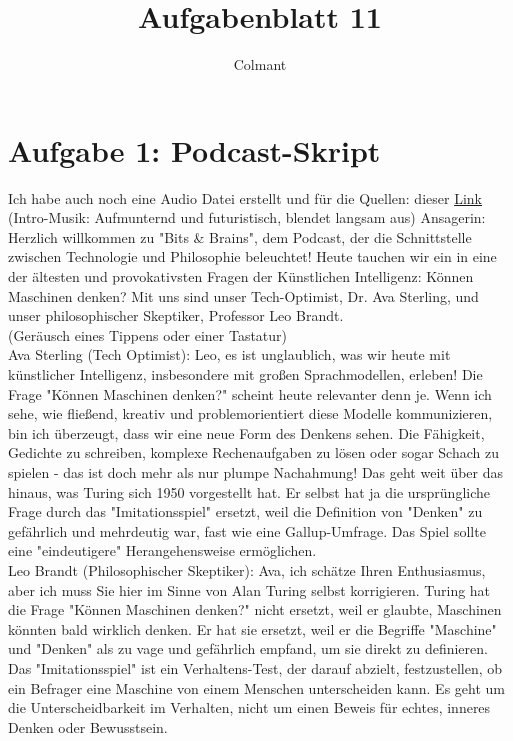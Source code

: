 \documentclass[a4paper,12pt]{scrartcl}
\title{Aufgabenblatt 11}
\begin{document}
\author{Colmant}
\maketitle
\newpage
\section*{Aufgabe 1: Podcast-Skript}
Ich habe auch noch eine Audio Datei erstellt und für die Quellen: dieser \href{https://notebooklm.google.com/notebook/d8672557-a59e-4866-9869-17dd2a630f79}{Link}
(Intro-Musik: Aufmunternd und futuristisch, blendet langsam aus)
Ansagerin: Herzlich willkommen zu "Bits \& Brains", dem Podcast, der die Schnittstelle zwischen Technologie und Philosophie beleuchtet! Heute tauchen wir ein in eine der ältesten und provokativsten Fragen der Künstlichen Intelligenz: Können Maschinen denken? Mit uns sind unser Tech-Optimist, Dr. Ava Sterling, und unser philosophischer Skeptiker, Professor Leo Brandt.\\
(Geräusch eines Tippens oder einer Tastatur)\\
Ava Sterling (Tech Optimist): Leo, es ist unglaublich, was wir heute mit künstlicher Intelligenz, insbesondere mit großen Sprachmodellen, erleben! Die Frage "Können Maschinen denken?" scheint heute relevanter denn je. Wenn ich sehe, wie fließend, kreativ und problemorientiert diese Modelle kommunizieren, bin ich überzeugt, dass wir eine neue Form des Denkens sehen. Die Fähigkeit, Gedichte zu schreiben, komplexe Rechenaufgaben zu lösen oder sogar Schach zu spielen - das ist doch mehr als nur plumpe Nachahmung! Das geht weit über das hinaus, was Turing sich 1950 vorgestellt hat. Er selbst hat ja die ursprüngliche Frage durch das "Imitationsspiel" ersetzt, weil die Definition von "Denken" zu gefährlich und mehrdeutig war, fast wie eine Gallup-Umfrage. Das Spiel sollte eine "eindeutigere" Herangehensweise ermöglichen.\\
Leo Brandt (Philosophischer Skeptiker): Ava, ich schätze Ihren Enthusiasmus, aber ich muss Sie hier im Sinne von Alan Turing selbst korrigieren. Turing hat die Frage "Können Maschinen denken?" nicht ersetzt, weil er glaubte, Maschinen könnten bald wirklich denken. Er hat sie ersetzt, weil er die Begriffe "Maschine" und "Denken" als zu vage und gefährlich empfand, um sie direkt zu definieren. Das "Imitationsspiel" ist ein Verhaltens-Test, der darauf abzielt, festzustellen, ob ein Befrager eine Maschine von einem Menschen unterscheiden kann. Es geht um die Unterscheidbarkeit im Verhalten, nicht um einen Beweis für echtes, inneres Denken oder Bewusstsein.\\
\end{document}
